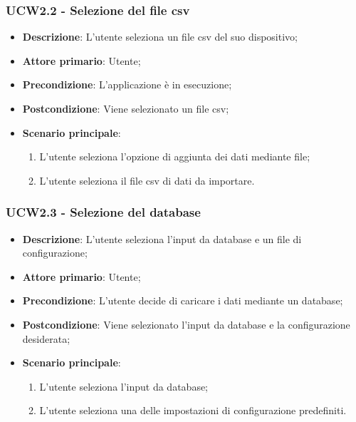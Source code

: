 \subsubsection{UCW2.2 - Selezione del file csv}
\label{ssub:ucw2.2}
\begin{itemize}
    \item \textbf{Descrizione}: L'utente seleziona un file csv del suo dispositivo;

    \item \textbf{Attore primario}: Utente;

    \item \textbf{Precondizione}:   L'applicazione è in esecuzione;
    \item \textbf{Postcondizione}:  Viene selezionato un file csv;

    \item \textbf{Scenario principale}:
          \begin{enumerate}
              \item L'utente seleziona l'opzione di aggiunta dei dati mediante file;
              \item L'utente seleziona il file csv di dati da importare.
          \end{enumerate}
\end{itemize}

\subsubsection{UCW2.3 - Selezione del database}
\label{ssub:ucw2.3}
\begin{itemize}
    \item \textbf{Descrizione}: L'utente seleziona l'input da database e un file di configurazione;

    \item \textbf{Attore primario}: Utente;

    \item \textbf{Precondizione}:   L'utente decide di caricare i dati mediante un database;
    \item \textbf{Postcondizione}:  Viene selezionato l'input da database e la configurazione desiderata;

    \item \textbf{Scenario principale}:
          \begin{enumerate}
              \item L'utente seleziona l'input da database;
              \item L'utente seleziona una delle impostazioni di configurazione predefiniti.
          \end{enumerate}

\end{itemize}
